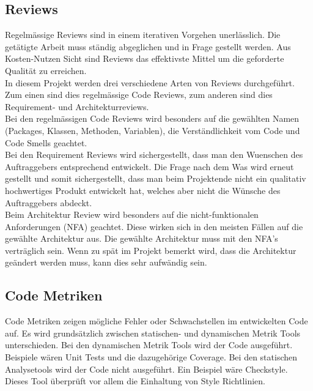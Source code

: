 \subsection{Reviews}
Regelmässige Reviews sind in einem iterativen Vorgehen unerlässlich. Die getätigte Arbeit muss ständig abgeglichen und in Frage gestellt werden. Aus Kosten-Nutzen Sicht sind Reviews das effektivste Mittel um die geforderte Qualität zu erreichen.\\ 

\noindent In diesem Projekt werden drei verschiedene Arten von Reviews durchgeführt. Zum einen sind dies regelmässige Code Reviews, zum anderen sind dies Requirement- und Architekturreviews.\\

\noindent Bei den regelmässigen Code Reviews wird besonders auf die gewählten Namen (Packages, Klassen, Methoden, Variablen), die Verständlichkeit vom Code und Code Smells geachtet.\\

\noindent Bei den Requirement Reviews wird sichergestellt, dass man den Wuenschen des Auftraggebers entsprechend entwickelt. Die Frage nach dem \glqq Was\grqq{} wird erneut gestellt und somit sichergestellt, dass man beim Projektende nicht ein qualitativ hochwertiges Produkt entwickelt hat, welches aber nicht die Wünsche des Auftraggebers abdeckt.\\ 

\noindent Beim Architektur Review wird besonders auf die nicht-funktionalen Anforderungen (NFA) geachtet. Diese wirken sich in den meisten Fällen auf die gewählte Architektur aus. Die gewählte Architektur muss mit den NFA's verträglich sein. Wenn zu spät im Projekt bemerkt wird, dass die Architektur geändert werden muss, kann dies sehr aufwändig sein.
\subsection{Code Metriken}
Code Metriken zeigen mögliche Fehler oder Schwachstellen im entwickelten Code auf. Es wird grundsätzlich zwischen statischen- und dynamischen Metrik Tools unterschieden. Bei den dynamischen Metrik Tools wird der Code ausgeführt. Beispiele wären Unit Tests und die dazugehörige Coverage. Bei den statischen Analysetools wird der Code nicht ausgeführt. Ein Beispiel wäre Checkstyle. Dieses Tool überprüft vor allem die Einhaltung von Style Richtlinien.\\